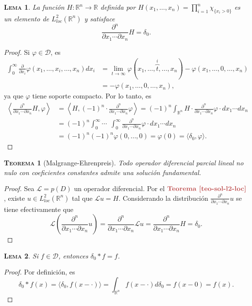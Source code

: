 \documentclass[11pt]{article}
\theoremstyle{colored}
\newtheorem{theorem}{\scshape Teorema}
\newtheorem{lemma}{\scshape Lema}
\newcommand{\R}{\mathbb{R}}
\newcommand{\test}{\mathscr{D}}
\newcommand{\ev}[1]{\langle #1 \rangle}
\renewcommand{\L}{\mathscr{L}}
\newcommand{\paint}[1]{\color{color}{#1}}
\newcommand{\tpaint}[1]{\paint{\textbf{#1}}}
\begin{document}
\begin{lemma} La función $H : \R^n \to \R$ definida por $H(x_1,\dots, x_n) = \prod_{i=1}^n \chi_{\{x_i > 0\}}$ es un elemento de $L_{loc}^2(\R^n)$ y satisface
\[
\frac{\partial^n}{\partial x_1 \cdots \partial x_n} H = \delta_0.
\]
\end{lemma}
\begin{proof} Si $\varphi \in \test$, es
\begin{align*}
\int_0^\infty \frac{\partial}{\partial x_i}\varphi(x_1,\dots, x_i,\dots,x_n)dx_i &= \lim_{t \to \infty} \varphi(x_1,\dots,\overbrace{t}^i,\dots,x_n) - \varphi(x_1, \dots,0,\dots,x_n)\\
& = - \varphi(x_1, \dots,0,\dots,x_n),
\end{align*}
ya que $\varphi$ tiene soporte compacto. Por lo tanto, es
\begin{align*}
\left\ev{\frac{\partial^n}{\partial x_1 \cdots \partial x_n} H,\varphi\right} &= \left\ev{H,(-1)^n \cdot \frac{\partial^n}{\partial x_1 \cdots \partial x_n}\varphi\right} = (-1)^n\int_{\R^n}H \cdot \frac{\partial^n}{\partial x_1 \cdots \partial x_n}\varphi \cdot dx_1 \cdots dx_n\\
&= (-1)^n\int_0^\infty \cdots \ \ \int_0^\infty\frac{\partial^n}{\partial x_1 \cdots \partial x_n}\varphi \cdot dx_1 \cdots dx_n\\ &= (-1)^n(-1)^n\varphi(0,\dots,0) = \varphi(0) = \ev{\delta_0,\varphi}.
\end{align*}
\end{proof}

\begin{theorem}[Malgrange-Ehrenpreis] Todo operador diferencial parcial lineal no nulo con coeficientes constantes admite una solución fundamental.
\end{theorem}
\begin{proof} Sea $\L = p(D)$ un operador diferencial. Por el $\tpaint{Teorema \ref{teo-sol-l2-loc}}$, existe $u \in L^2_{loc}(\R^n)$ tal que $\L u = H$. Considerando la distribución $\frac{\partial^n}{\partial x_1 \cdots \partial x_n} u$ se tiene efectivamente que
\[
\L \left(\frac{\partial^n}{\partial x_1 \cdots \partial x_n} u\right) = \frac{\partial^n}{\partial x_1 \cdots \partial x_n} \L u = \frac{\partial^n}{\partial x_1 \cdots \partial x_n} H = \delta_0.
\]
\end{proof}

\begin{lemma} Si $f \in \test$, entonces $\delta_0 \ast f = f$.
\end{lemma}
\begin{proof} Por definición, es
\[
\delta_0 \ast f(x) = \ev{\delta_0,f(x -\cdot)} = \int_{\R^n} f(x-\cdot) d \delta_0 = f(x - 0) = f(x).
\]
\end{proof}
\end{document}
